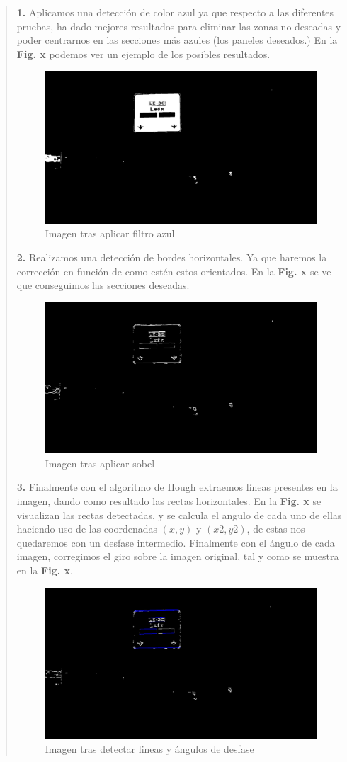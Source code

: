 \documentclass[a4paper, 12pt]{article}
\begin{document}
\begin{quote}
	\textbf{1.} Aplicamos una detección de color azul ya que respecto a las diferentes pruebas, ha dado mejores resultados para eliminar las zonas no deseadas y poder centrarnos en las secciones más azules (los paneles deseados.) En la \textbf{Fig. x} podemos ver un ejemplo de los posibles resultados.
	\begin{figure}[h]
		\centering
		\includegraphics[width=0.6\linewidth]{img/image_blue_f}
		\caption{Imagen tras aplicar filtro azul}
		\label{fig:imagebluef}
	\end{figure}
	
	\textbf{2.} Realizamos una detección de bordes horizontales. Ya que haremos la corrección en función de como estén estos orientados. En la \textbf{Fig. x} se ve que conseguimos las secciones deseadas.
	
	\begin{figure}[h]
		\centering
		\includegraphics[width=0.6\linewidth]{img/image_boder_h}
		\caption{Imagen tras aplicar sobel}
		\label{fig:imageboderh}
	\end{figure}
	\textbf{3.} Finalmente con el algoritmo de Hough extraemos líneas presentes en la imagen, dando como resultado las rectas horizontales. En la \textbf{Fig. x} se visualizan las rectas detectadas, y se calcula el angulo de cada uno de ellas haciendo uso de las coordenadas $(x, y)$ y $(x2, y2)$, de estas nos quedaremos con un desfase intermedio. Finalmente con el ángulo de cada imagen, corregimos el giro sobre la imagen original, tal y como se muestra en la \textbf{Fig. x}.
	
	\begin{figure}[h]
		\centering
		\includegraphics[width=0.6\linewidth]{img/image_with_lines+}
		\caption{Imagen tras detectar lineas y ángulos de desfase}
		\label{fig:imagewithlines}
	\end{figure}
	

\end{quote}
\end{document}
